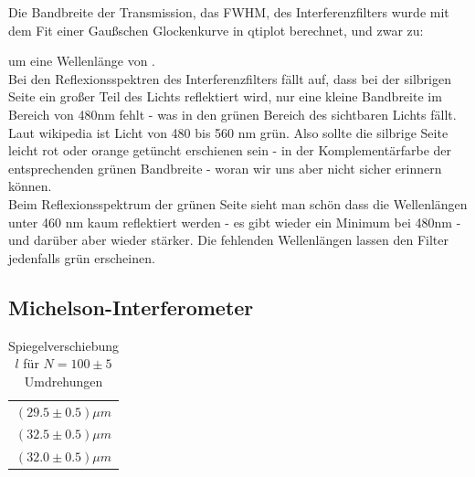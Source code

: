 \documentclass{article}
\begin{document}
Die Bandbreite der Transmission, das FWHM, des Interferenzfilters wurde mit dem Fit einer Gaußschen Glockenkurve in qtiplot berechnet, und zwar zu:
\begin{center}
\end{center}
um eine Wellenlänge von .\\

Bei den Reflexionsspektren des Interferenzfilters  fällt auf, dass bei der silbrigen Seite ein großer Teil des Lichts reflektiert wird, nur eine kleine Bandbreite im Bereich von 480nm fehlt - was in den grünen Bereich des sichtbaren Lichts fällt. Laut wikipedia ist Licht von 480 bis 560 nm grün. Also sollte die silbrige Seite leicht rot oder orange getüncht erschienen sein - in der Komplementärfarbe der entsprechenden grünen Bandbreite - woran wir uns aber nicht sicher erinnern können. \\
Beim Reflexionsspektrum der grünen Seite   sieht man schön dass die Wellenlängen unter 460 nm kaum reflektiert werden - es gibt wieder ein Minimum bei 480nm - und darüber aber wieder stärker. Die fehlenden Wellenlängen lassen den Filter jedenfalls grün erscheinen.
\subsection{Michelson-Interferometer}
\begin{table}[H]
\begin{center}
\begin{tabular}{c}
$(29.5\pm 0.5)\mu m$\\
$(32.5\pm 0.5)\mu m$\\
$(32.0\pm 0.5)\mu m$\\
\end{tabular}
\caption{Spiegelverschiebung $l$ für $N=100 \pm 5$ Umdrehungen}
\end{center}
\end{table}
\vspace{0.3mm}
\end{document}

